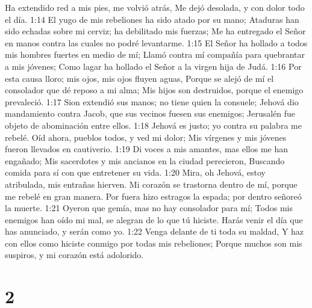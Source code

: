 Ha extendido red a mis pies, me volvió atrás,  
Me dejó desolada, y con dolor todo el día.  
1:14 El yugo de mis rebeliones ha sido atado por su mano;  
Ataduras han sido echadas sobre mi cerviz; ha debilitado mis fuerzas;  
Me ha entregado el Señor en manos contra las cuales no podré levantarme.  
1:15 El Señor ha hollado a todos mis hombres fuertes en medio de mí;  
Llamó contra mí compañía para quebrantar a mis jóvenes;  
Como lagar ha hollado el Señor a la virgen hija de Judá.  
1:16 Por esta causa lloro; mis ojos, mis ojos fluyen aguas,  
Porque se alejó de mí el consolador que dé reposo a mi alma;  
Mis hijos son destruidos, porque el enemigo prevaleció.  
1:17 Sion extendió sus manos; no tiene quien la consuele;  
Jehová dio mandamiento contra Jacob, que sus vecinos fuesen sus enemigos;  
Jerusalén fue objeto de abominación entre ellos.  
1:18 Jehová es justo; yo contra su palabra me rebelé.  
Oíd ahora, pueblos todos, y ved mi dolor;  
Mis vírgenes y mis jóvenes fueron llevados en cautiverio.  
1:19 Di voces a mis amantes, mas ellos me han engañado;  
Mis sacerdotes y mis ancianos en la ciudad perecieron,  
Buscando comida para sí con que entretener su vida.  
1:20 Mira, oh Jehová, estoy atribulada, mis entrañas hierven.  
Mi corazón se trastorna dentro de mí, porque me rebelé en gran manera.  
Por fuera hizo estragos la espada; por dentro señoreó la muerte.  
1:21 Oyeron que gemía, mas no hay consolador para mí;  
Todos mis enemigos han oído mi mal, se alegran de lo que tú hiciste.  
Harás venir el día que has anunciado, y serán como yo.  
1:22 Venga delante de ti toda su maldad,  
Y haz con ellos como hiciste conmigo por todas mis rebeliones;  
Porque muchos son mis suspiros, y mi corazón está adolorido.  

\chapter{2}

